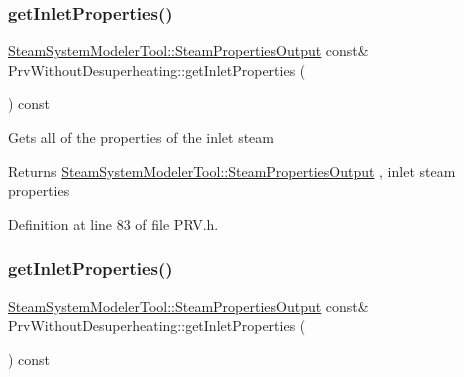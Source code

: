 \mbox{\label{class_prv_without_desuperheating_aefb61f9d9dd99216459f6948308d11e9}} 
\subsubsection{\texorpdfstring{get\+Inlet\+Properties()}{getInletProperties()}\hspace{0.1cm}{\footnotesize\ttfamily [2/3]}}
{\footnotesize\ttfamily \hyperlink{struct_steam_system_modeler_tool_1_1_steam_properties_output}{Steam\+System\+Modeler\+Tool\+::\+Steam\+Properties\+Output} const\& Prv\+Without\+Desuperheating\+::get\+Inlet\+Properties (\begin{DoxyParamCaption}{ }\end{DoxyParamCaption}) const\hspace{0.3cm}{\ttfamily [inline]}}

Gets all of the properties of the inlet steam \begin{DoxyReturn}{Returns}
\hyperlink{struct_steam_system_modeler_tool_1_1_steam_properties_output}{Steam\+System\+Modeler\+Tool\+::\+Steam\+Properties\+Output} , inlet steam properties 
\end{DoxyReturn}


Definition at line 83 of file P\+R\+V.\+h.

\mbox{\label{class_prv_without_desuperheating_aefb61f9d9dd99216459f6948308d11e9}} 
\subsubsection{\texorpdfstring{get\+Inlet\+Properties()}{getInletProperties()}\hspace{0.1cm}{\footnotesize\ttfamily [3/3]}}
{\footnotesize\ttfamily \hyperlink{struct_steam_system_modeler_tool_1_1_steam_properties_output}{Steam\+System\+Modeler\+Tool\+::\+Steam\+Properties\+Output} const\& Prv\+Without\+Desuperheating\+::get\+Inlet\+Properties (\begin{DoxyParamCaption}{ }\end{DoxyParamCaption}) const\hspace{0.3cm}{\ttfamily [inline]}}

